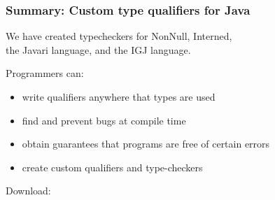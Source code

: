 \documentclass{beamer}
\begin{document}
\frame
{
  \frametitle{Summary: Custom type qualifiers for Java}
  \begin{center}
  We have created typecheckers for NonNull, Interned,\\the Javari language,
  and the IGJ language.
  \end{center}

  Programmers can:
  \begin{itemize}
  \item write qualifiers anywhere that types are used
  \item find and prevent bugs at compile time 
  \item obtain guarantees that programs are free of certain errors
  \item create custom qualifiers and type-checkers
  \end{itemize}

  \begin{center}
  Download:\\
  \end{center}
}
\end{document}
